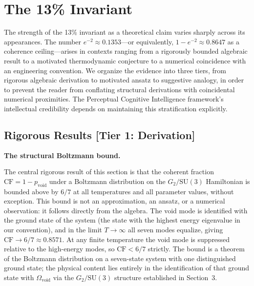 \documentclass[12pt,a4paper]{article}
\begin{document}
\section{The 13\% Invariant}

The strength of the 13\% invariant as a theoretical claim varies sharply across its appearances. The number $e^{-2} \approx 0.1353$---or equivalently, $1 - e^{-2} \approx 0.8647$ as a coherence ceiling---arises in contexts ranging from a rigorously bounded algebraic result to a motivated thermodynamic conjecture to a numerical coincidence with an engineering convention. We organize the evidence into three tiers, from rigorous algebraic derivation to motivated ansatz to suggestive analogy, in order to prevent the reader from conflating structural derivations with coincidental numerical proximities. The Perceptual Cognitive Intelligence framework's intellectual credibility depends on maintaining this stratification explicitly.

\subsection{Rigorous Results [Tier 1: Derivation]}

\textbf{The structural Boltzmann bound.}

The central rigorous result of this section is that the coherent fraction $\mathrm{CF} = 1 - p_{\mathrm{void}}$ under a Boltzmann distribution on the $G_2/\mathrm{SU}(3)$ Hamiltonian is bounded above by $6/7$ at all temperatures and all parameter values, without exception. This bound is not an approximation, an ansatz, or a numerical observation: it follows directly from the algebra. The void mode is identified with the ground state of the system (the state with the highest energy eigenvalue in our convention), and in the limit $T \to \infty$ all seven modes equalize, giving $\mathrm{CF} \to 6/7 \approx 0.8571$. At any finite temperature the void mode is suppressed relative to the high-energy modes, so $\mathrm{CF} < 6/7$ strictly. The bound is a theorem of the Boltzmann distribution on a seven-state system with one distinguished ground state; the physical content lies entirely in the identification of that ground state with $\Omega_{\mathrm{void}}$ via the $G_2/\mathrm{SU}(3)$ structure established in Section~3.
\end{document}
